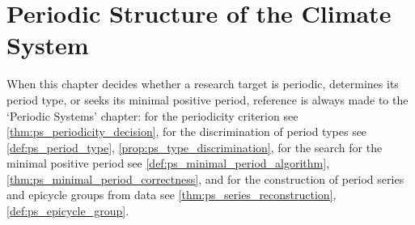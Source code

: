 \chapter{Periodic Structure of the Climate System}

\begin{remark}\label{rem:climate_ps_hook}
When this chapter decides whether a research target is periodic, determines its period type, or seeks its minimal positive period, reference is always made to the `Periodic Systems' chapter:
for the periodicity criterion see \cref{thm:ps_periodicity_decision},
for the discrimination of period types see \cref{def:ps_period_type}, \cref{prop:ps_type_discrimination},
for the search for the minimal positive period see \cref{def:ps_minimal_period_algorithm}, \cref{thm:ps_minimal_period_correctness},
and for the construction of period series and epicycle groups from data see \cref{thm:ps_series_reconstruction}, \cref{def:ps_epicycle_group}.
\end{remark}

